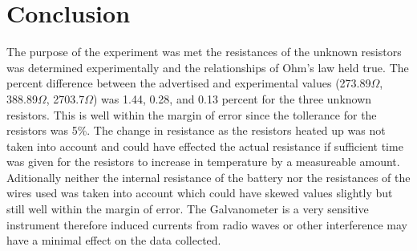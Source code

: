 \documentclass[11pt,letterpaper]{article}
\begin{document}
\section*{Conclusion}
The purpose of the experiment was met the resistances of the unknown resistors was determined experimentally and the relationships of Ohm's law held true. The percent difference between the advertised and experimental values (273.89\(\Omega\), 388.89\(\Omega\), 2703.7\(\Omega\)) was 1.44, 0.28, and 0.13 percent for the three unknown resistors. This is well within the margin of error since the tollerance for the resistors was 5\%. The change in resistance as the resistors heated up was not taken into account and could have effected the actual resistance if sufficient time was given for the resistors to increase in temperature by a measureable amount. Aditionally neither the internal resistance of the battery nor the resistances of the wires used was taken into account which could have skewed values slightly but still well within the margin of error. The Galvanometer is a very sensitive instrument therefore induced currents from radio waves or other interference may have a minimal effect on the data collected.
\end{document}
